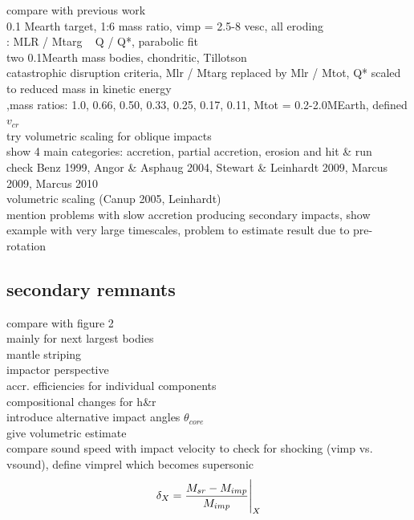 compare with previous work\\
\cite{Benz:1988p3336} 0.1 Mearth target, 1:6 mass ratio, vimp = 2.5-8 vesc, all eroding\\
\cite{Benz1999Icar..142....5B}: MLR / Mtarg ~ Q / Q*, parabolic fit \\
\cite{Agnor:2004p3329}  two 0.1Mearth mass bodies, chondritic, Tillotson \\
\cite{Stewart:2009p3265} catastrophic disruption criteria, Mlr / Mtarg replaced by Mlr / Mtot, Q* scaled to reduced mass in kinetic energy \\ 
\cite{2010ApJ...714L..21K} ,mass ratios: 1.0, 0.66, 0.50, 0.33, 0.25, 0.17, 0.11, Mtot = 0.2-2.0MEarth, defined $v_{cr}$ \\
try volumetric scaling for oblique impacts \\
show 4 main categories: accretion, partial accretion, erosion and hit \& run \\
check Benz 1999, Angor \& Asphaug 2004, Stewart \& Leinhardt 2009, Marcus 2009, Marcus 2010 \\
volumetric scaling (Canup 2005, Leinhardt) \\
mention problems with slow accretion producing secondary impacts, show example with very large timescales, problem to estimate result due to pre-rotation\\




\subsection{secondary remnants}
\cite{Agnor:2004p3329} compare with figure 2\\

mainly for next largest bodies\\
mantle striping\\
impactor perspective\\
accr. efficiencies for individual components \\
compositional changes for h\&r \\
introduce alternative impact angles $\theta_{core}$ \\
give volumetric estimate \\
compare sound speed with impact velocity to check for shocking (vimp vs. vsound), define vimprel which becomes supersonic \\

\begin{equation}
\delta_X = \frac{M_{sr} - M_{imp}}{M_{imp}} \Bigg|_{X}
\end{equation}


